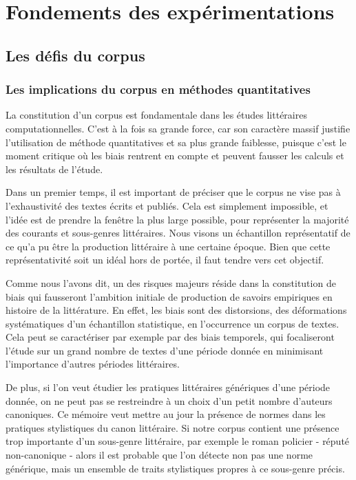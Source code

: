 \part{Fondements des expérimentations}

\chapter{Les défis du corpus}

\section{Les implications du corpus en méthodes quantitatives}

La constitution d'un corpus est fondamentale dans les études littéraires computationnelles. C'est à la fois sa grande force, car son caractère massif justifie l'utilisation de méthode quantitatives et sa plus grande faiblesse, puisque c'est le moment critique où les biais rentrent en compte et peuvent fausser les calculs et les résultats de l'étude. 

Dans un premier temps, il est important de préciser que le corpus ne vise pas à l'exhaustivité des textes écrits et publiés. Cela est simplement impossible, et l'idée est de prendre la fenêtre la plus large possible, pour représenter la majorité des courants et sous-genres littéraires. Nous visons un échantillon représentatif de ce qu'a pu être la production littéraire à une certaine époque. Bien que cette représentativité soit un idéal hors de portée, il faut tendre vers cet objectif. 

Comme nous l'avons dit, un des risques majeurs réside dans la constitution de biais qui fausseront l'ambition initiale de production de savoirs empiriques en histoire de la littérature. En effet, les biais sont des distorsions, des déformations systématiques d'un échantillon statistique, en l'occurrence un corpus de textes. Cela peut se caractériser par exemple par des biais temporels, qui focaliseront l'étude sur un grand nombre de textes d'une période donnée en minimisant l'importance d'autres périodes littéraires. 

De plus, si l'on veut étudier les pratiques littéraires génériques d'une période donnée, on ne peut pas se restreindre à un choix d'un petit nombre d'auteurs canoniques. Ce mémoire veut mettre au jour la présence de normes dans les pratiques stylistiques du canon littéraire. Si notre corpus contient une présence trop importante d'un sous-genre littéraire, par exemple le roman policier - réputé non-canonique - alors il est probable que l'on détecte non pas une norme générique, mais un ensemble de traits stylistiques propres à ce sous-genre précis. 

